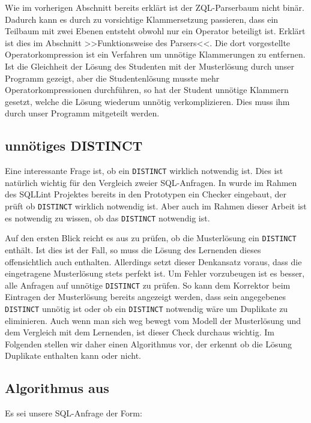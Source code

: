 Wie im vorherigen Abschnitt bereits erklärt ist der ZQL-Parserbaum nicht binär. Dadurch kann es durch zu vorsichtige Klammersetzung passieren, dass ein Teilbaum mit zwei Ebenen entsteht obwohl nur ein Operator beteiligt ist. Erklärt ist dies im Abschnitt >>Funktionsweise des Parsers<<. Die dort vorgestellte Operatorkompression ist ein Verfahren um unnötige Klammerungen zu entfernen. Ist die Gleichheit der Lösung des Studenten mit der Musterlösung durch unser Programm gezeigt, aber die Studentenlösung musste mehr Operatorkompressionen durchführen, so hat der Student unnötige Klammern gesetzt, welche die Lösung wiederum unnötig verkomplizieren. Dies muss ihm durch unser Programm mitgeteilt werden.

\subsection{unnötiges DISTINCT}

Eine interessante Frage ist, ob ein \verb|DISTINCT| wirklich notwendig ist. Dies ist natürlich wichtig für den Vergleich zweier SQL-Anfragen. In \cite{brass2} wurde im Rahmen des SQLLint Projektes bereits in den Prototypen ein Checker eingebaut, der prüft ob \verb|DISTINCT| wirklich notwendig ist. Aber auch im Rahmen dieser Arbeit ist es notwendig zu wissen, ob das \verb|DISTINCT| notwendig ist. 

Auf den ersten Blick reicht es aus zu prüfen, ob die Musterlösung ein \verb|DISTINCT| enthält. Ist dies ist der Fall, so muss die Lösung des Lernenden dieses offensichtlich auch enthalten. Allerdings setzt dieser Denkansatz voraus, dass die eingetragene Musterlösung stets perfekt ist. Um Fehler vorzubeugen ist es besser, alle Anfragen auf unnötige \verb|DISTINCT| zu prüfen. So kann dem Korrektor beim Eintragen der Musterlösung bereits angezeigt werden, dass sein angegebenes \verb|DISTINCT| unnötig ist oder ob ein \verb|DISTINCT| notwendig wäre um Duplikate zu eliminieren. Auch wenn man sich weg bewegt vom Modell der Musterlösung und dem Vergleich mit dem Lernenden, ist dieser Check durchaus wichtig. Im Folgenden stellen wir daher einen Algorithmus vor, der erkennt ob die Lösung Duplikate enthalten kann oder nicht.

\subsection{Algorithmus aus \cite{sql1folien}}

Es sei unsere SQL-Anfrage der Form:

